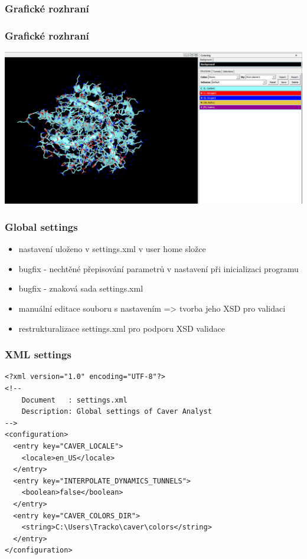 \documentclass[slovak]{beamer}
\begin{document}
\begin{frame}
\frametitle{Grafické rozhraní}
	\frametitle{Grafické rozhraní}
	\includegraphics[width=\linewidth]{colorpanel.jpg}
\end{frame}

\begin{frame}
\frametitle{Global settings}
	\begin{itemize}
		\item nastavení uloženo v settings.xml v user home složce
		\item bugfix - nechtěné přepisování parametrů v nastavení při inicializaci programu
		\item bugfix - znaková sada settings.xml
		\item manuální editace souboru s nastavením => tvorba jeho XSD pro validaci
		\item restrukturalizace settings.xml pro podporu XSD validace
	\end{itemize}
\end{frame}

\begin{frame}[fragile]
	\frametitle{XML settings}
	\lstset{language=XML}
	\scriptsize{
	\begin{lstlisting}
<?xml version="1.0" encoding="UTF-8"?>
<!--
    Document   : settings.xml
    Description: Global settings of Caver Analyst
-->
<configuration>
  <entry key="CAVER_LOCALE">
    <locale>en_US</locale>
  </entry>
  <entry key="INTERPOLATE_DYNAMICS_TUNNELS">
    <boolean>false</boolean>
  </entry>
  <entry key="CAVER_COLORS_DIR">
    <string>C:\Users\Tracko\caver\colors</string>
  </entry>
</configuration>
	\end{lstlisting}}
\end{frame}
\end{document}
